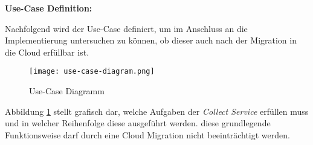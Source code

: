 \textbf{Use-Case Definition:}

Nachfolgend wird der Use-Case definiert, um im Anschluss an die Implementierung untersuchen zu können, ob dieser auch nach der Migration in die Cloud erfüllbar ist.

\begin{figure}[H]
    \centering
    \texttt{[image: use-case-diagram.png]}
    \caption{Use-Case Diagramm}
    \label{fig:use-case-diagram}
\end{figure}

Abbildung \ref{fig:use-case-diagram} stellt grafisch dar, welche Aufgaben der \textit{Collect Service} erfüllen muss und in welcher Reihenfolge diese ausgeführt werden. diese grundlegende Funktionsweise darf durch eine Cloud Migration nicht beeinträchtigt werden.

